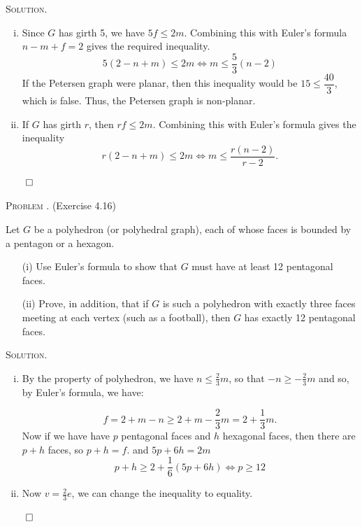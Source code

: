 \documentclass[12pt, a4paper, oneside]{ctexart}
\newcounter{problemname}
\newenvironment{problem}{\begin{framed}\stepcounter{problemname}\par\noindent\textsc{Problem \arabic{problemname}. }}{\end{framed}\par}
\newenvironment{solution}{%
	\par\noindent\textsc{Solution. }\ignorespaces
}{%
	\hfill$\qed$\par
}
\begin{document}
	\begin{solution}
		\begin{enumerate}[(i)]
            \item 	Since $G$ has girth 5, we have $5f \leq 2m$. 
            Combining this with Euler's formula $n - m + f = 2$ gives the required inequality. 
            \[ 5(2-n+m) \leq 2m \Leftrightarrow m\leq \dfrac{5}{3}(n-2)\]
            If the Petersen graph were planar, then this inequality would be 
            $15 \leq \dfrac{40}{3}$, which is false. Thus, the Petersen graph is non-planar.
            \item   If $G$ has girth $r$, then $rf \leq 2m$. 
            Combining this with Euler's formula gives the inequality
            \[
            r(2-n+m) \leq 2m \Leftrightarrow m \leq \frac{r(n - 2)}{r - 2}.
            \]

        \end{enumerate}

       

		
	\end{solution}


	\begin{problem}
		(Exercise 4.16)
        
        Let $G$ be a polyhedron (or polyhedral graph), each of whose faces is bounded by a pentagon or a hexagon.
        \begin{enumerate}
            \item[(i)] Use Euler's formula to show that $G$ must have at least 12 pentagonal faces.
            \item[(ii)] Prove, in addition, that if $G$ is such a polyhedron with exactly three faces meeting at each vertex (such as a football), then $G$ has exactly 12 pentagonal faces.
        \end{enumerate}
        

	\end{problem}

	\begin{solution}
        \begin{enumerate}[(i)]
            \item By the property of polyhedron, we have $n \leq \frac{2}{3} m$, 
            so that $-n \geq -\frac{2}{3} m$ and so, by Euler's formula, we have:

            \[
            f = 2 + m - n \geq 2 + m - \frac{2}{3} m = 2 + \frac{1}{3} m.
            \]
            Now if we have have $p$ pentagonal faces and $h$ hexagonal faces, 
            then there are $p + h$ faces, so $p + h = f$. and $5p + 6h = 2m$ 
            \[p+h\geq 2 + \dfrac{1}{6}(5p + 6 h) \Leftrightarrow p\geq 12\]
            \item Now $v = \frac{2}{3} e$, we can change the inequality to equality.

        \end{enumerate}
    
	\end{solution}
     
\end{document}

